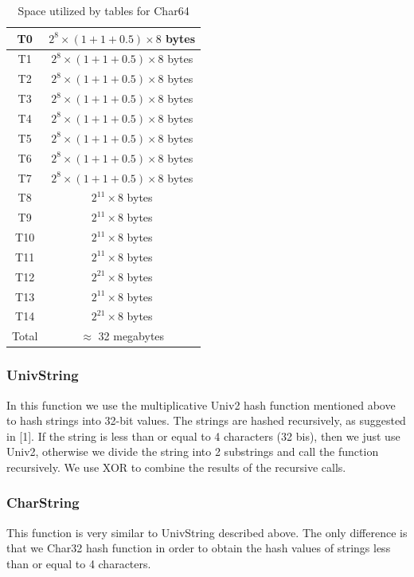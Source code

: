 \documentclass[11pt]{article}
\begin{document}
\begin{table}
\centering 
\begin{tabular}{|c|c|}
  \hline
T0 & $2^{8}\times(1+1+0.5) \times8$ bytes\\  \hline
T1 & $2^{8}\times(1+1+0.5) \times8$ bytes\\ \hline
T2 & $2^{8}\times (1+1+0.5) \times8$ bytes\\  \hline
T3 & $2^{8}\times (1+1+0.5) \times8$ bytes\\ \hline
T4 & $2^{8}\times(1+1+0.5) \times8$ bytes\\  \hline
T5 & $2^{8}\times(1+1+0.5) \times8$ bytes\\ \hline
T6 & $2^{8}\times (1+1+0.5) \times8$ bytes\\  \hline
T7 & $2^{8}\times (1+1+0.5) \times8$ bytes\\ \hline
T8 & $2^{11}\times8$ bytes\\  \hline
T9 & $2^{11}\times8$ bytes\\ \hline
T10 & $2^{11}\times8$ bytes\\  \hline
T11 & $2^{11}\times8$ bytes\\ \hline
T12 & $2^{21}\times8$ bytes\\  \hline
T13 & $2^{11}\times8$ bytes\\ \hline
T14 & $2^{21}\times8$ bytes\\
  \hline \hline
  Total & $\approx$ 32 megabytes \\
  \hline
\end{tabular}
\caption{Space utilized by tables for Char64}
\label{tab:char64mem}
\end{table}
\subsubsection{UnivString}
In this function we use the multiplicative Univ2 hash function mentioned above to hash strings into 32-bit values. The strings are hashed recursively, as suggested in [1]. If the string is less than or equal to 4 characters (32 bis), then we just use Univ2, otherwise we divide the string into 2 substrings and call the function recursively. We use XOR to combine the results of the recursive calls.
\subsubsection{CharString}
This function is very similar to UnivString described above. The only difference is that we Char32 hash function in order to obtain the hash values of strings less than or equal to 4 characters.
\end{document}

